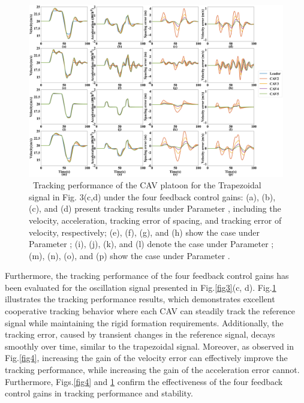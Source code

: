 \documentclass[a4paper]{cas-sc}
\begin{document}
\begin{figure}
  \centering
  \includegraphics[width=14cm]{figs/fig5.png}
  \caption{~Tracking performance of the CAV platoon for the Trapezoidal signal in Fig. 3(c,d) under the four feedback control gains: (a), (b), (c), and (d) present tracking results under Parameter \uppercase\expandafter{}, including the velocity, acceleration, tracking error of spacing, and tracking error of velocity, respectively; (e), (f), (g), and (h) show the case under Parameter \uppercase\expandafter{}; (i), (j), (k), and (l) denote the case under Parameter \uppercase\expandafter{}; (m), (n), (o), and (p) show the case under Parameter \uppercase\expandafter{}.}
  \label{fig5}
\end{figure}

Furthermore, the tracking performance of the four feedback control gains has been evaluated for the oscillation signal presented in Fig.\ref{fig3}(c, d). Fig.\ref{fig5} illustrates the tracking performance results, which demonstrates excellent cooperative tracking behavior where each CAV can steadily track the reference signal while maintaining the rigid formation requirements. Additionally, the tracking error, caused by transient changes in the reference signal, decays smoothly over time, similar to the trapezoidal signal. Moreover, as observed in Fig.\ref{fig4}, increasing the gain of the velocity error can effectively improve the tracking performance, while increasing the gain of the acceleration error cannot. Furthermore, Figs.\ref{fig4} and \ref{fig5} confirm the effectiveness of the four feedback control gains in tracking performance and stability.
\end{document}
